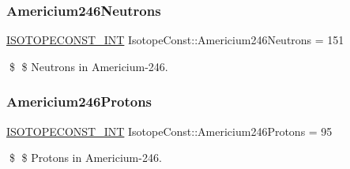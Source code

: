 \subsubsection{\texorpdfstring{Americium246\+Neutrons}{Americium246Neutrons}}
{\footnotesize\ttfamily \mbox{\hyperlink{group___isotope_const-_macros_ga5f18360b3e99483a35c32d789e62621c}{I\+S\+O\+T\+O\+P\+E\+C\+O\+N\+S\+T\+\_\+\+I\+NT}} Isotope\+Const\+::\+Americium246\+Neutrons = 151}

\$ \$ Neutrons in Americium-\/246. \mbox{\label{group___isotope_const-_americium-_am246_gaa92684cd8292162fd4a6059ce5dbbe12}} 
\subsubsection{\texorpdfstring{Americium246\+Protons}{Americium246Protons}}
{\footnotesize\ttfamily \mbox{\hyperlink{group___isotope_const-_macros_ga5f18360b3e99483a35c32d789e62621c}{I\+S\+O\+T\+O\+P\+E\+C\+O\+N\+S\+T\+\_\+\+I\+NT}} Isotope\+Const\+::\+Americium246\+Protons = 95}

\$ \$ Protons in Americium-\/246. 